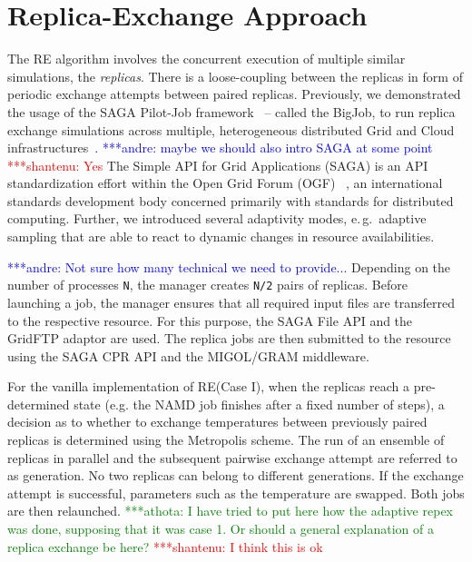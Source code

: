 \documentclass[a4paper,10pt]{article}
\newcommand{\jhanote}[1]{ {\textcolor{red} { ***shantenu: #1 }}}
\newcommand{\alnote}[1]{ {\textcolor{blue} { ***andre: #1 }}}
\newcommand{\athotanote}[1]{ {\textcolor{green} { ***athota: #1 }}}
\newcommand{\alnote}[1]{}
\newcommand{\jhanote}[1]{}
\newcommand{\athotanote}[1]{}
\begin{document}

\section{Replica-Exchange Approach}

The RE algorithm involves the concurrent execution of multiple similar
simulations, the \emph{replicas}.  There is a loose-coupling between
the replicas in form of periodic exchange attempts between paired
replicas. Previously, we demonstrated the usage of the SAGA Pilot-Job
framework~\cite{saga_bigjob_condor_cloud} -- called the BigJob, to run
replica exchange simulations across multiple, heterogeneous
distributed Grid and Cloud infrastructures~\cite{Luckow:2008fp}.
\alnote{maybe we should also intro SAGA at some point} \jhanote{Yes}
The Simple API for Grid Applications (SAGA) is an
API standardization effort within the Open Grid Forum
(OGF) ~\cite{}, an international standards development body
concerned primarily with standards for distributed computing.
Further, we introduced several adaptivity modes, e.\,g.\ adaptive
sampling that are able to react to dynamic changes in resource
availabilities.

\alnote{Not sure how many technical we need to provide...}  Depending
on the number of processes \texttt{N}, the manager creates \texttt{N/2} pairs
of replicas.  Before launching a job, the manager ensures that all
required input files are transferred to the respective resource. For
this purpose, the SAGA File API and the GridFTP adaptor are used. The
replica jobs are then submitted to the resource using the SAGA CPR
API and the MIGOL/GRAM middleware.

For the vanilla implementation of RE(Case I), when the replicas reach a
pre-determined state (e.g. the NAMD job finishes after a fixed number
of steps), a decision as to whether to exchange temperatures between
previously paired replicas is determined using the Metropolis scheme.
The run of an ensemble of replicas in parallel and the subsequent
pairwise exchange attempt are referred to as generation. No two
replicas can belong to different generations. If the exchange attempt
is successful, parameters such as the temperature are swapped. Both
jobs are then relaunched.  \athotanote{I have tried to put here how
  the adaptive repex was done, supposing that it was case 1. Or should
  a general explanation of a replica exchange be here?} \jhanote{I
  think this is ok}
 
\end{document}
